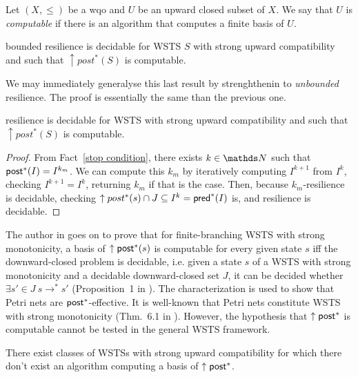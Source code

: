 Let $(X,\leq)$ be a wqo and $U$ be an upward closed subset of $X$. We say that $U$ is \emph{computable} if there is an algorithm that computes a finite basis of $U$.


\begin{theorem}\cite{DBLP:conf/gg/Ozkan22,DBLP:journals/corr/abs-2108-00889}
{\sc bounded resilience} is decidable for WSTS $S$ with strong upward compatibility and such that $\uparrow post^*(S)$ is computable.
\end{theorem}

We may immediately generalyse this last result by strenghthenin to \emph{unbounded} resilience. The proof is essentially the same than the previous one.

\begin{corollary}
{\sc resilience} is decidable for WSTS with strong upward compatibility and such that $\uparrow post^*(S)$ is computable.
\end{corollary}


\begin{proof}
From Fact~\ref{stop condition}, there exists $k \in \N$ such that
$\textsf{post}^*(I) = I^{k_m}$. We can compute this $k_m$ by iteratively computing
$I^{k+1}$ from $I^k$, checking $I^{k+1}=I^k$, 
returning $k_m$ if that is the case.
Then, because $k_m$-resilience is decidable, 
checking $\uparrow post^*(s) \cap J \subseteq I^k = \textsf{pred}^*(I)$ is,
and resilience is decidable.
\end{proof}

The author in \cite{DBLP:conf/gg/Ozkan22}
 goes on to prove that for finite-branching WSTS with strong monotonicity, a basis of $\uparrow \textsf{post}^*(s)$ is computable for every given state $s$ iff the downward-closed problem is decidable, i.e. given a state $s$ of a WSTS
with strong monotonicity 
and a decidable downward-closed set $J$, it can be decided whether $\exists s' \in J ~ s \to^* s'$ (Proposition~1 in \cite{DBLP:conf/gg/Ozkan22}). 
The characterization is used to show that Petri nets are $\textsf{post}^*$-effective. It is well-known that Petri nets constitute WSTS with strong monotonicity (Thm.~6.1 in \cite{DBLP:journals/tcs/FinkelS01}).
However, the hypothesis that $\uparrow \textsf{post}^*$ is computable cannot be tested in the general WSTS framework.

\begin{proposition}
There exist classes of WSTSs with strong upward compatibility for which there don't exist an algorithm computing a basis of $\uparrow \textsf{post}^*$.
\end{proposition}


